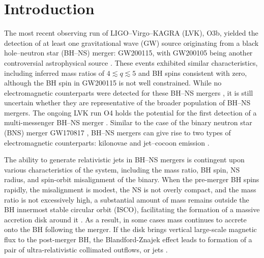 \documentclass[twocolumn,dvipsnames]{aastex62}
\begin{document}
\section{Introduction}\label{sec:introduction}

The most recent observing run of LIGO--Virgo--KAGRA (LVK), O3b, yielded the detection of at least one gravitational wave (GW) source originating from a black hole--neutron star (BH--NS) merger: GW200115, with GW200105 being another controversial astrophysical source \citep{Abbott2021}. These events exhibited similar characteristics, including inferred mass ratios of $4 \lesssim q \lesssim 5$ and BH spins consistent with zero, although the BH spin in GW200115 is not well constrained. While no electromagnetic counterparts were detected for these BH--NS mergers \citep{Dichiara2021,Zhu2021}, it is still uncertain whether they are representative of the broader population of BH--NS mergers. The ongoing LVK run O4 holds the potential for the first detection of a multi-messenger BH--NS merger \citep{Abbott2020}. Similar to the case of the binary neutron star (BNS) merger GW170817 \citep[see][for reviews]{Nakar2019,Margutti2021}, BH--NS mergers can give rise to two types of electromagnetic counterparts: kilonovae and jet--cocoon emission \citep[e.g.,][]{Paczynski1991,Mochkovitch1993,Janka1999,Rosswog2005,Surman2008,Metzger2010,Tanaka2014,Fernandez2015,Fernandez2017,Foucart2015,Kawaguchi2016,Darbha2021,Wanajo2022,Ekanger2023,Gompertz2023}.

The ability to generate relativistic jets in BH--NS mergers is contingent upon various characteristics of the system, including the mass ratio, BH spin, NS radius, and spin-orbit misalignment of the binary. When the pre-merger BH spins rapidly, the misalignment is modest, the NS is not overly compact, and the mass ratio is not excessively high, a substantial amount of mass remains outside the BH innermost stable circular orbit (ISCO), facilitating the formation of a massive accretion disk around it \citep{Shibata2006,Shibata2007,Etienne2008,Rantsiou2008,Shibata2008,Shibata2011,Duez2010,Foucart2011,Foucart2012b,Foucart2014,Foucart2017,Foucart2019,Kyutoku2011,Kyutoku2013,Kyutoku2015,Foucart2012a,Kawaguchi2015,Fragione2021,Hayashi2021,Sarin2022,Biscoveanu2023}. As a result, in some cases mass continues to accrete onto the BH following the merger. If the disk brings vertical large-scale magnetic flux to the post-merger BH, the Blandford-Znajek effect leads to formation of a pair of ultra-relativistic collimated outflows, or jets \citep{Blandford1977}.
\end{document}
